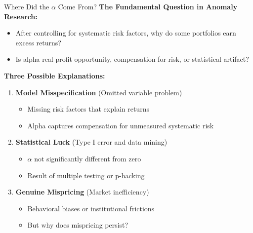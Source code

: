 \documentclass{beamer}
\begin{document}
\begin{frame}{Where Did the $\alpha$ Come From?}
    \textbf{The Fundamental Question in Anomaly Research:}
    \begin{itemize}
        \item After controlling for systematic risk factors, why do some portfolios earn excess returns?
        \item Is alpha real profit opportunity, compensation for risk, or statistical artifact?
    \end{itemize}
    
    \vspace{0.3cm}
    \textbf{Three Possible Explanations:}
    \begin{enumerate}
        \item \textbf{Model Misspecification} (Omitted variable problem)
        \begin{itemize}
            \item Missing risk factors that explain returns
            \item Alpha captures compensation for unmeasured systematic risk
        \end{itemize}
        \item \textbf{Statistical Luck} (Type I error and data mining)
        \begin{itemize}
            \item $\alpha$ not significantly different from zero
            \item Result of multiple testing or p-hacking
        \end{itemize}
        \item \textbf{Genuine Mispricing} (Market inefficiency)
        \begin{itemize}
            \item Behavioral biases or institutional frictions
            \item But why does mispricing persist?
        \end{itemize}
    \end{enumerate}
\end{frame}
\end{document}
